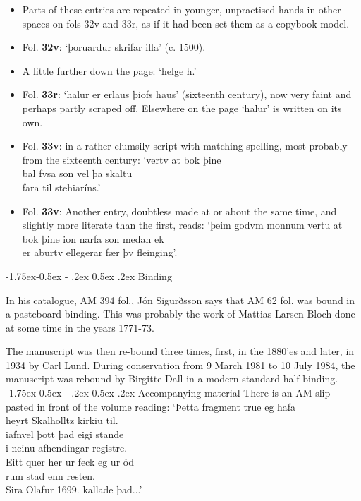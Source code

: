 \documentclass[11pt,twoside]{article}\makeatletter
\makeatletter
\def\ref{}
\renewcommand\subsection{\@startsection{subsection}{2}{\z@}%
     {-1.75ex\@plus -0.5ex \@minus- .2ex}%
     {0.5ex \@plus .2ex}%
     {\reset@font\Large\sffamily}}
\makeatother
\begin{document}
\begin{itemize}
\item Parts of these entries are repeated in younger, unpractised hands in other spaces on fols 32v and 33r, as if it had been set them as a copybook model.
\item Fol. \textbf{32v}:  ‘þoruardur skrifar illa’ (c. 1500).
\item A little further down the page: ‘helge h.’
\item Fol. \textbf{33r}:  ‘halur er erlaus þiofs haus’ (sixteenth century), now very faint and perhaps partly scraped off. Elsewhere on the page ‘halur’ is written on its own.
\item Fol. \textbf{33v}:  in a rather clumsily script with matching spelling, most probably from the sixteenth century: ‘vertv at bok þine {\hskip1pt}\\{} bal fvsa son vel þa skaltu {\hskip1pt}\\{} fara til stehiaríns.’
\item Fol. \textbf{33v}:  Another entry, doubtless made at or about the same time, and slightly more literate than the first, reads: ‘þeim godvm monnum vertu at bok þine ion narfa son medan ek {\hskip1pt}\\{} er aburtv ellegerar fær þv fleinging’.
\end{itemize} 
\subsection{Binding}
\par
In his catalogue,  {\ref AM 394 fol.},  {\name Jón Sigurðsson} says that AM 62 fol. was bound in a pasteboard binding. This was probably the work of  {\name Mattias Larsen Bloch} done at some time in the years 1771-73.\par
The manuscript was then re-bound three times, first, in the 1880'es and later, in 1934 by  {\name Carl Lund}. During conservation from 9 March 1981 to 10 July 1984, the manuscript was rebound by  {\name Birgitte Dall} in a modern standard half-binding.
\subsection{Accompanying material}
There is an AM-slip pasted in front of the volume reading: ‘Þetta fragment true eg hafa {\hskip1pt}\\{} heyrt Skalholltz kirkiu til. {\hskip1pt}\\{} iafnvel þott þad eigi stande {\hskip1pt}\\{} i neinu afhendingar registre. {\hskip1pt}\\{} Eitt quer her ur feck eg ur ỏd{\hskip1pt}\\{}rum stad enn resten. {\hskip1pt}\\{} Sira Olafur 1699. kallade þad...’
\end{document}
